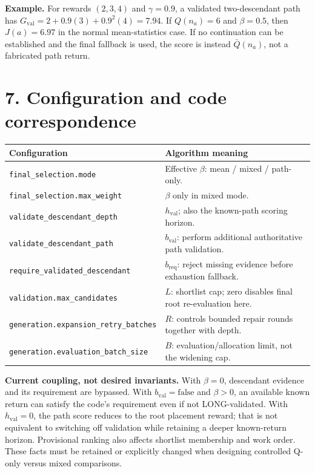 \documentclass[11pt]{article}
\newcommand{\Gval}{G_{\mathrm{val}}}
\newcommand{\MeanRoot}{\bar Q}
\begin{document}
\textbf{Example.} For rewards $(2,3,4)$ and $\gamma=0.9$, a validated
two-descendant path has $\Gval=2+0.9(3)+0.9^2(4)=7.94$.
If $Q(n_a)=6$ and $\beta=0.5$, then $J(a)=6.97$ in the normal mean-statistics
case. If no continuation can be established and the final fallback is used,
the score is instead $\MeanRoot(n_a)$, not a fabricated path return.

\newpage
\section*{7. Configuration and code correspondence}
\small
\begin{tabular}{p{.49\linewidth}p{.45\linewidth}}
\hline
Configuration & Algorithm meaning \\
\hline
\texttt{final\_selection.mode} & Effective $\beta$: mean / mixed / path-only.\\
\texttt{final\_selection.max\_weight} & $\beta$ only in mixed mode.\\
\texttt{validate\_descendant\_depth} & $h_{\mathrm{val}}$; also the known-path scoring horizon.\\
\texttt{validate\_descendant\_path} & $b_{\mathrm{val}}$: perform additional authoritative path validation.\\
\texttt{require\_validated\_descendant} & $b_{\mathrm{req}}$: reject missing evidence before exhaustion fallback.\\
\texttt{validation.max\_candidates} & $L$: shortlist cap; zero disables final root re-evaluation here.\\
\texttt{generation.expansion\_retry\_batches} & $R$: controls bounded repair rounds together with depth.\\
\texttt{generation.evaluation\_batch\_size} & $B$: evaluation/allocation limit, not the widening cap.\\
\hline
\end{tabular}

\textbf{Current coupling, not desired invariants.}
With $\beta=0$, descendant evidence and its requirement are bypassed.
With $b_{\mathrm{val}}=\mathrm{false}$ and $\beta>0$, an available known return
can satisfy the code's requirement even if not LONG-validated.
With $h_{\mathrm{val}}=0$, the path score reduces to the root placement reward;
that is not equivalent to switching off validation while retaining a deeper
known-return horizon. Provisional ranking also affects shortlist membership and
work order. These facts must be retained or explicitly changed when designing
controlled Q-only versus mixed comparisons.
\end{document}
